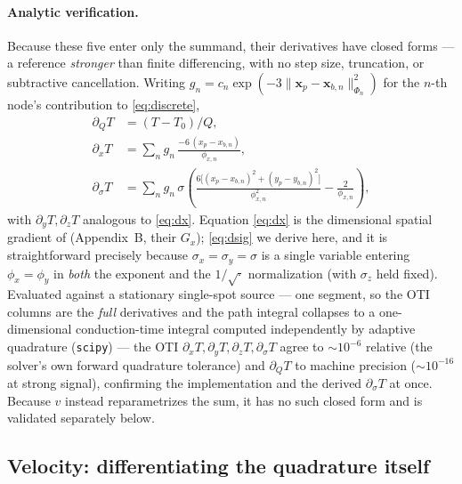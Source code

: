 \documentclass[11pt]{article}
\begin{document}
\paragraph{Analytic verification.} Because these five enter only the summand,
their derivatives have closed forms --- a reference \emph{stronger} than finite
differencing, with no step size, truncation, or subtractive cancellation.
Writing $g_n = c_n\exp(-3\|\mathbf{x}_p-\mathbf{x}_{b,n}\|^2_{\Phi_n})$ for the
$n$-th node's contribution to \eqref{eq:discrete},
\begin{align}
  \partial_Q T &= (T-T_0)/Q, \label{eq:dQ}\\
  \partial_x T &= \sum_n g_n\,\frac{-6\,(x_p-x_{b,n})}{\phi_{x,n}}, \label{eq:dx}\\
  \partial_\sigma T &= \sum_n g_n\,\sigma\!\left(
        \frac{6\bigl[(x_p-x_{b,n})^2+(y_p-y_{b,n})^2\bigr]}{\phi_{x,n}^2}
        - \frac{2}{\phi_{x,n}}\right), \label{eq:dsig}
\end{align}
with $\partial_y T,\partial_z T$ analogous to \eqref{eq:dx}. Equation
\eqref{eq:dx} is the dimensional spatial gradient of \cite{stump2019}
(Appendix~B, their $G_x$); \eqref{eq:dsig} we derive here, and it is
straightforward precisely because $\sigma_x=\sigma_y=\sigma$ is a single
variable entering $\phi_x=\phi_y$ in \emph{both} the exponent and the
$1/\sqrt{\cdot}$ normalization (with $\sigma_z$ held fixed). Evaluated against a
stationary single-spot source --- one segment, so the OTI columns are the
\emph{full} derivatives and the path integral collapses to a one-dimensional
conduction-time integral computed independently by adaptive quadrature
(\texttt{scipy}) --- the OTI $\partial_x T,\partial_y T,\partial_z T,
\partial_\sigma T$ agree to $\sim\!10^{-6}$ relative (the solver's own forward
quadrature tolerance) and $\partial_Q T$ to machine precision
($\sim\!10^{-16}$ at strong signal), confirming the implementation and the
derived $\partial_\sigma T$ at once. Because $v$ instead reparametrizes the
sum, it has no such closed form and is validated separately below.

\subsection{Velocity: differentiating the quadrature itself}
\label{sec:velderiv}
\end{document}
